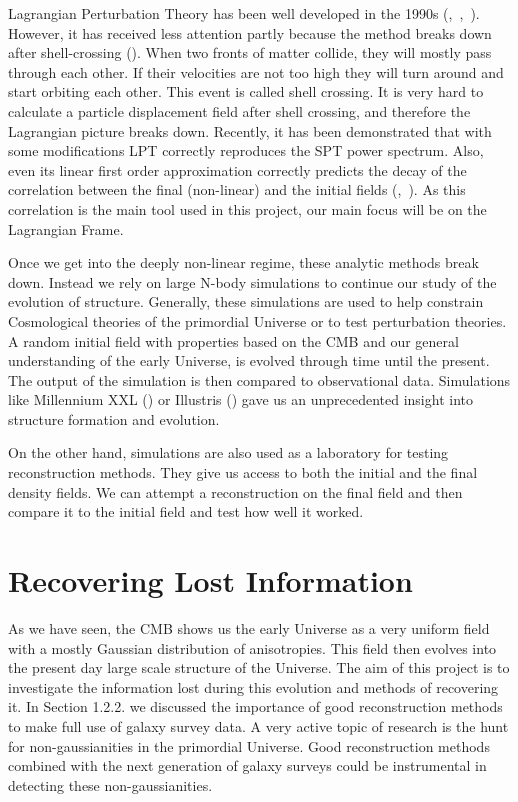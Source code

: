 Lagrangian Perturbation Theory has been well developed in the 1990s (\cite{1992MNRAS.254..729B},~\cite{1993MNRAS.264..375B},~\cite{1994MNRAS.267..811B}). However, it has received less attention partly because the method breaks down after shell-crossing (\cite{Carlson_perturbation_theory}).
When two fronts of matter collide, they will mostly pass through each other. If their velocities are not too high they will turn around and start orbiting each other. This event is called shell crossing. It is very hard to calculate a particle displacement field after shell crossing, and therefore the Lagrangian picture breaks down. Recently, it has been demonstrated that with some modifications LPT correctly reproduces the SPT power spectrum. Also, even its linear first order approximation correctly predicts the decay of the correlation between the final (non-linear) and the initial fields (\cite{2008PhRvD..77f3530M},~\cite{2008PhRvD..78h3519M}). As this correlation is the main tool used in this project, our main focus will be on the Lagrangian Frame. 

Once we get into the deeply non-linear regime, these analytic methods break down. Instead we rely on large N-body simulations to continue our study of the evolution of structure. Generally, these simulations are used to help constrain Cosmological theories of the primordial Universe or to test perturbation theories. A random initial field with properties based on the CMB and our general understanding of the early Universe, is evolved through time until the present. The output of the simulation is then compared to observational data. Simulations like Millennium XXL (\cite{Millennium_XXL}) or Illustris (\cite{Illustris_sim}) gave us an unprecedented insight into structure formation and evolution.

On the other hand, simulations are also used as a laboratory for testing reconstruction methods. They give us access to both the initial and the final density fields. We can attempt a reconstruction on the final field and then compare it to the initial field and test how well it worked. 

\section{Recovering Lost Information}

As we have seen, the CMB shows us the early Universe as a very uniform field with a mostly Gaussian distribution of anisotropies. This field then evolves into the present day large scale structure of the Universe. The aim of this project is to investigate the information lost during this evolution and methods of recovering it. In Section 1.2.2. we discussed the importance of good reconstruction methods to make full use of galaxy survey data. A very active topic of research is the hunt for non-gaussianities in the primordial Universe. Good reconstruction methods combined with the next generation of galaxy surveys could be instrumental in detecting these non-gaussianities.

